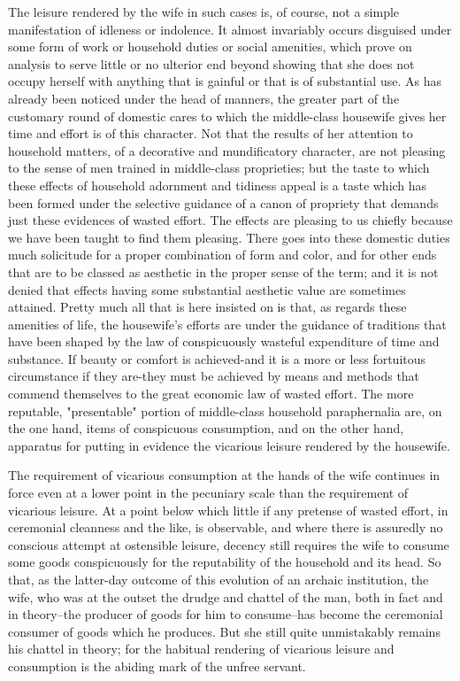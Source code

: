 \documentclass[12pt]{report}
\begin{document}
The leisure rendered by the wife in such cases is, of course, not a
simple manifestation of idleness or indolence. It almost invariably
occurs disguised under some form of work or household duties or social
amenities, which prove on analysis to serve little or no ulterior end
beyond showing that she does not occupy herself with anything that is
gainful or that is of substantial use. As has already been noticed under
the head of manners, the greater part of the customary round of domestic
cares to which the middle-class housewife gives her time and effort is
of this character. Not that the results of her attention to household
matters, of a decorative and mundificatory character, are not pleasing
to the sense of men trained in middle-class proprieties; but the taste
to which these effects of household adornment and tidiness appeal is a
taste which has been formed under the selective guidance of a canon
of propriety that demands just these evidences of wasted effort. The
effects are pleasing to us chiefly because we have been taught to find
them pleasing. There goes into these domestic duties much solicitude for
a proper combination of form and color, and for other ends that are to
be classed as aesthetic in the proper sense of the term; and it is
not denied that effects having some substantial aesthetic value are
sometimes attained. Pretty much all that is here insisted on is that, as
regards these amenities of life, the housewife's efforts are under the
guidance of traditions that have been shaped by the law of conspicuously
wasteful expenditure of time and substance. If beauty or comfort is
achieved-and it is a more or less fortuitous circumstance if they
are-they must be achieved by means and methods that commend themselves
to the great economic law of wasted effort. The more reputable,
"presentable" portion of middle-class household paraphernalia are, on
the one hand, items of conspicuous consumption, and on the other hand,
apparatus for putting in evidence the vicarious leisure rendered by the
housewife.

The requirement of vicarious consumption at the hands of the wife
continues in force even at a lower point in the pecuniary scale than the
requirement of vicarious leisure. At a point below which little if any
pretense of wasted effort, in ceremonial cleanness and the like,
is observable, and where there is assuredly no conscious attempt at
ostensible leisure, decency still requires the wife to consume some
goods conspicuously for the reputability of the household and its head.
So that, as the latter-day outcome of this evolution of an archaic
institution, the wife, who was at the outset the drudge and chattel of
the man, both in fact and in theory--the producer of goods for him to
consume--has become the ceremonial consumer of goods which he produces.
But she still quite unmistakably remains his chattel in theory; for the
habitual rendering of vicarious leisure and consumption is the abiding
mark of the unfree servant.
\end{document}
